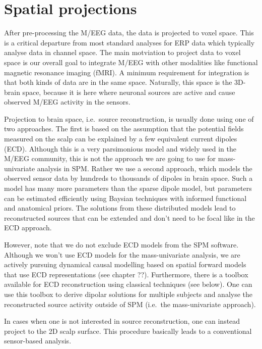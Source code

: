 \chapter{Spatial projections \label{Chap:eeg:source}}

After pre-processing the M/EEG data, the data is projected to voxel
space. This is a critical departure from most standard analyses for
ERP data which typically analyse data in channel space. The main
motviation to project data to voxel space is our overall goal to integrate
M/EEG with other modalities like functional magnetic resonance imaging
(fMRI). A minimum requirement for integration is that both kinds of
data are in the same space. Naturally, this space is the 3D-brain
space, because it is here where neuronal sources are active and cause
observed M/EEG activity in the sensors. 

Projection to brain space, i.e.~source reconstruction, is usually done
using one of two approaches. The first is based on the assumption that
the potential fields measured on the scalp can be explained by a few
equivalent current dipoles (ECD). Although this is a very parsimonious
model and widely used in the M/EEG community, this is not the approach
we are going to use for mass-univariate analysis in SPM. Rather we use
a second approach, which models the observed sensor data by hundreds to
thousands of dipoles in brain space. Such a model has many more
parameters than the sparse dipole model, but parameters can be
estimated efficiently using Baysian techniques with informed
functional and anatomical priors. The solutions from these distributed
models lead to reconstructed sources that can be extended and don't
need to be focal like in the ECD approach.

However, note that we do not exclude ECD models from the SPM
software. Although we won't use ECD models for the mass-univariate
analysis, we are actively pursuing dynamical causal modelling based on
spatial forward models that use ECD representations (see chapter
??). Furthermore, there is a toolbox available for ECD reconstruction
using classical techniques (see below). One can use this toolbox to derive
dipolar solutions for multiple subjects and analyse the reconstructed
source activity outside of SPM (i.e.~the mass-univariate approach).

In cases when one is not interested in source reconstruction, one can
instead project to the 2D scalp surface. This procedure basically
leads to a conventional sensor-based analysis. 

